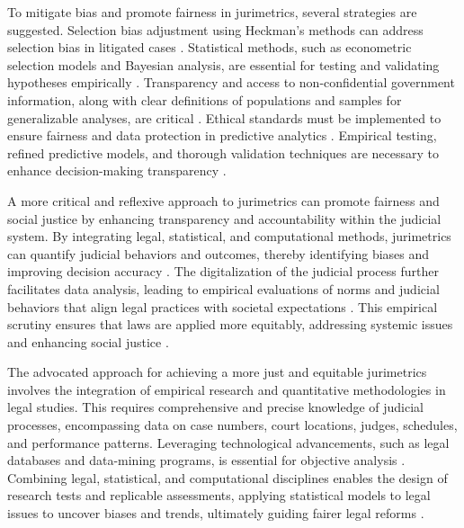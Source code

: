 To mitigate bias and promote fairness in jurimetrics, several strategies are suggested. Selection bias adjustment using Heckman’s methods can address selection bias in litigated cases \cite{ribeiro1998}. Statistical methods, such as econometric selection models and Bayesian analysis, are essential for testing and validating hypotheses empirically \cite{ribeiro1998, zabala2019}. Transparency and access to non-confidential government information, along with clear definitions of populations and samples for generalizable analyses, are critical \cite{zabala1809}. Ethical standards must be implemented to ensure fairness and data protection in predictive analytics \cite{silva2023}. Empirical testing, refined predictive models, and thorough validation techniques are necessary to enhance decision-making transparency \cite{de2010, ribeiro1998}.

A more critical and reflexive approach to jurimetrics can promote fairness and social justice by enhancing transparency and accountability within the judicial system. By integrating legal, statistical, and computational methods, jurimetrics can quantify judicial behaviors and outcomes, thereby identifying biases and improving decision accuracy \cite{nunes2018_pages_153-153, zabala1809_pages_1-1}. The digitalization of the judicial process further facilitates data analysis, leading to empirical evaluations of norms and judicial behaviors that align legal practices with societal expectations \cite{colombo2017_pages_3-4, massuanganhe2016_pages_26-27}. This empirical scrutiny ensures that laws are applied more equitably, addressing systemic issues and enhancing social justice \cite{nunes2018_pages_104-105, loevinger1949_pages_30-31}.

The advocated approach for achieving a more just and equitable jurimetrics involves the integration of empirical research and quantitative methodologies in legal studies. This requires comprehensive and precise knowledge of judicial processes, encompassing data on case numbers, court locations, judges, schedules, and performance patterns. Leveraging technological advancements, such as legal databases and data-mining programs, is essential for objective analysis \cite{nunes2018, pages 89-89}. Combining legal, statistical, and computational disciplines enables the design of research tests and replicable assessments, applying statistical models to legal issues to uncover biases and trends, ultimately guiding fairer legal reforms \cite{massuanganhe2016,pages 25-25, maia2019,pages 4-4}.


